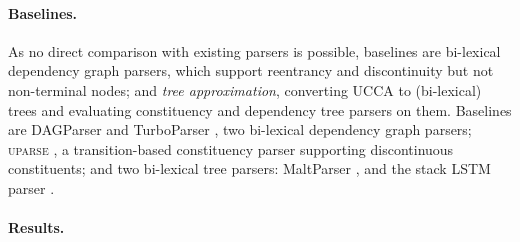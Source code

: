\documentclass[12pt]{report}
\begin{document}
\paragraph{Baselines.}
As no direct comparison with existing parsers is possible,
baselines are bi-lexical dependency graph parsers,
which support reentrancy and discontinuity but not non-terminal nodes;
and \textit{tree approximation}, converting UCCA to (bi-lexical) trees
and evaluating constituency and dependency tree parsers on them.
Baselines are DAGParser \cite{ribeyre-villemontedelaclergerie-seddah:2014:SemEval} and
TurboParser \cite{almeida-martins:2015:SemEval},
two bi-lexical dependency graph parsers;
\textsc{uparse} \cite{maier-lichte:2016:DiscoNLP},
a transition-based constituency parser supporting discontinuous constituents;
and two bi-lexical tree parsers:
MaltParser \cite{nivre2007maltparser},
and the stack LSTM parser \cite{dyer2015transition}.


\paragraph{Results.}
\end{document}
